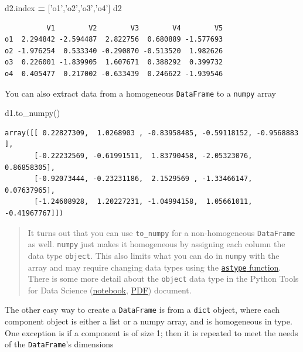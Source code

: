 \documentclass[
  letterpaper,
]{scrbook}
\newenvironment{Shaded}{\begin{snugshade}}{\end{snugshade}}
\newcommand{\NormalTok}[1]{#1}
\newcommand{\OperatorTok}[1]{\textcolor[rgb]{0.81,0.36,0.00}{\textbf{#1}}}
\newcommand{\StringTok}[1]{\textcolor[rgb]{0.31,0.60,0.02}{#1}}
\begin{document}
\begin{Shaded}
\begin{Highlighting}[]
\NormalTok{d2.index }\OperatorTok{=}\NormalTok{ [}\StringTok{'o1'}\NormalTok{,}\StringTok{'o2'}\NormalTok{,}\StringTok{'o3'}\NormalTok{,}\StringTok{'o4'}\NormalTok{]}
\NormalTok{d2}
\end{Highlighting}
\end{Shaded}

\begin{verbatim}
          V1        V2        V3        V4        V5
o1  2.294842 -2.594487  2.822756  0.680889 -1.577693
o2 -1.976254  0.533340 -0.290870 -0.513520  1.982626
o3  0.226001 -1.839905  1.607671  0.388292  0.399732
o4  0.405477  0.217002 -0.633439  0.246622 -1.939546
\end{verbatim}

You can also extract data from a homogeneous \texttt{DataFrame} to a \texttt{numpy} array

\begin{Shaded}
\begin{Highlighting}[]
\NormalTok{d1.to_numpy()}
\end{Highlighting}
\end{Shaded}

\begin{verbatim}
array([[ 0.22827309,  1.0268903 , -0.83958485, -0.59118152, -0.9568883 ],
       [-0.22232569, -0.61991511,  1.83790458, -2.05323076,  0.86858305],
       [-0.92073444, -0.23231186,  2.1529569 , -1.33466147,  0.07637965],
       [-1.24608928,  1.20227231, -1.04994158,  1.05661011, -0.41967767]])
\end{verbatim}

\begin{quote}
It turns out that you can use \texttt{to\_numpy} for a non-homogeneous \texttt{DataFrame} as well. \texttt{numpy} just makes it homogeneous by assigning each column the data type \texttt{object}. This also limits what you can do in \texttt{numpy} with the array and may require changing data types using the \href{https://numpy.org/devdocs/reference/generated/numpy.ndarray.astype.html}{\texttt{astype} function}. There is some more detail about the \texttt{object} data type in the Python Tools for Data Science (\href{01_python_tools_ds.ipynb\#object}{notebook}, \href{01_python_tools_ds.pdf}{PDF}) document.
\end{quote}

The other easy way to create a \texttt{DataFrame} is from a \texttt{dict} object, where each component object is either a list or a numpy array, and is homogeneous in type. One exception is if a component is of size 1; then it is repeated to meet the needs of the \texttt{DataFrame}'s dimensions
\end{document}
